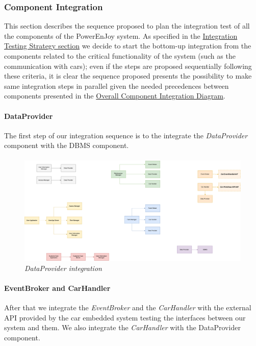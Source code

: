 \subsubsection{Component Integration}
This section describes the sequence proposed to plan the integration test of all the components of the PowerEnJoy system. As specified in the \hyperref[sec:intStrategy]{Integration Testing Strategy section} we decide to start the bottom-up integration from the components related to the critical functionality of the system (such as the communication with cars); even if the steps are proposed sequentially following these criteria, it is clear the sequence proposed presents the possibility to make same integration steps in parallel given the needed precedences between components presented in the \hyperref[sec:overallPrecedences]{Overall Component Integration Diagram}.

\paragraph{DataProvider} 
The first step of our integration sequence is to the integrate the \emph{DataProvider} component with the DBMS component.
\paragraph{}

		\begin{figure}[h]
			\centering
			\includegraphics[width=0.6\linewidth]{img/Integration1}
			\caption{
				\label{fig:dataProvider} 
				\emph{DataProvider integration}
			}
		\end{figure}

\paragraph{EventBroker and CarHandler} 
After that we integrate the \emph{EventBroker} and the \emph{CarHandler} with the external API provided by the car embedded system testing the interfaces between our system and them. We also integrate the \emph{CarHandler} with the {DataProvider} component.\\
